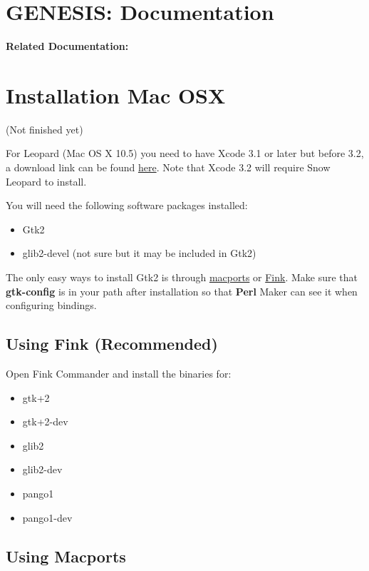 \documentclass[12pt]{article}
\begin{document}
\section*{GENESIS: Documentation}

{\bf Related Documentation:}


\section*{Installation Mac OSX} (Not finished yet)

For Leopard (Mac OS X 10.5) you need to have Xcode 3.1 or later but before 3.2, a download link can be found \href{http://www.freemacware.com/freemacware-downloads/2755}{here}. Note that Xcode 3.2 will require Snow Leopard to install.


You will need the following software packages installed:

\begin{itemize}
\item[] Gtk2
\item[] glib2-devel (not sure but it may be included in Gtk2)
\end{itemize}

The only easy ways to install Gtk2 is through \href{http://www.macports.org/}{macports} or \href{http://www.finkproject.org/}{Fink}. Make sure that {\bf gtk-config} is in your path after installation so that {\bf Perl} Maker can see it when configuring bindings. 

\subsection*{Using Fink (Recommended)}

Open Fink Commander and install the binaries for: 

\begin{itemize}
	\item[] gtk+2
	\item[] gtk+2-dev
	\item[] glib2
	\item[] glib2-dev
	\item[] pango1
	\item[] pango1-dev
\end{itemize}


\subsection*{Using Macports}
\end{document}
